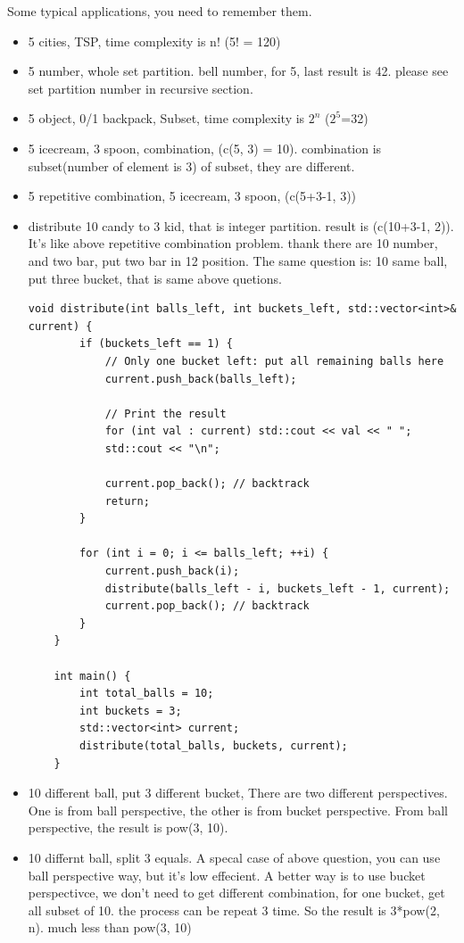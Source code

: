 \documentclass[a4paper,11pt,twoside]{book}
\begin{document}
\par Some typical applications, you need to remember them.
\begin{itemize}
	\item 5 cities, TSP, time complexity is n! (5! = 120)
	
	\item 5 number, whole set partition.  bell number, for 5, last result is 42. please see set partition number in recursive section.
	
	\item 5 object, 0/1 backpack,  Subset, time complexity is $2^n$ ($2^5$=32)
	
	\item 5 icecream, 3 spoon,  combination, (c(5, 3) = 10). combination is subset(number of element is 3) of subset, they are different. 
	
	\item 5 repetitive combination,   5 icecream, 3 spoon, (c(5+3-1, 3))
	
	\item distribute 10 candy to 3 kid, that is integer partition. result is (c(10+3-1, 2)). It's like above repetitive combination problem. thank there are 10 number, and two bar, put two bar in 12 position. The same question is: 10 same ball, put three bucket, that is same above quetions. 
	
\begin{lstlisting}
void distribute(int balls_left, int buckets_left, std::vector<int>& current) {
		if (buckets_left == 1) {
			// Only one bucket left: put all remaining balls here
			current.push_back(balls_left);
			
			// Print the result
			for (int val : current) std::cout << val << " ";
			std::cout << "\n";
			
			current.pop_back(); // backtrack
			return;
		}
		
		for (int i = 0; i <= balls_left; ++i) {
			current.push_back(i);
			distribute(balls_left - i, buckets_left - 1, current);
			current.pop_back(); // backtrack
		}
	}
	
	int main() {
		int total_balls = 10;
		int buckets = 3;
		std::vector<int> current;
		distribute(total_balls, buckets, current);
	}
\end{lstlisting}		

	
	\item 10 different ball, put 3 different bucket, There are two different perspectives. One is from ball perspective, the other is from bucket perspective.  From ball perspective, the result is pow(3, 10).
	
	
	\item 10 differnt ball, split 3 equals. A specal case of above question, you can use ball perspective way, but it's low effecient. A better way is to use bucket perspectivce, we don't need to get different combination, for one bucket, get all subset of 10. the process can be repeat 3 time. So the result is 3*pow(2, n). much less than pow(3, 10)
\end{itemize}
\end{document}
